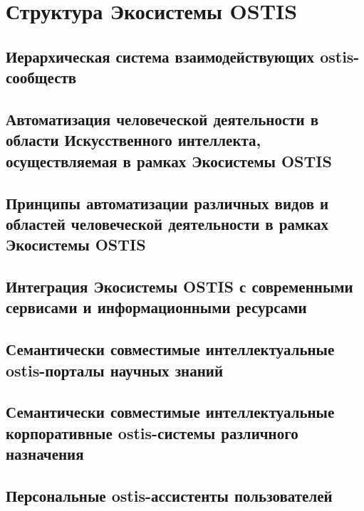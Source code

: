 \chapter{Структура Экосистемы OSTIS}
\label{chapter_ecosystem}


\section{Иерархическая система взаимодействующих ostis-сообществ}
\section{Автоматизация человеческой деятельности в области Искусственного интеллекта, осуществляемая в рамках Экосистемы OSTIS}
\section{Принципы автоматизации различных видов и областей человеческой деятельности в рамках Экосистемы OSTIS}
\section{Интеграция Экосистемы OSTIS с современными сервисами и информационными ресурсами}
\section{Семантически совместимые интеллектуальные ostis-порталы научных знаний}
\section{Семантически совместимые интеллектуальные корпоративные ostis-системы различного назначения}
\section{Персональные ostis-ассистенты пользователей}

%